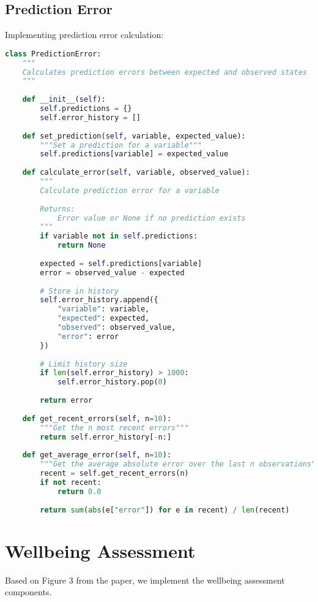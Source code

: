 \documentclass[11pt,a4paper]{article}
\begin{document}
\subsection{Prediction Error}
Implementing prediction error calculation:

\begin{lstlisting}[language=Python]
class PredictionError:
    """
    Calculates prediction errors between expected and observed states
    """
    
    def __init__(self):
        self.predictions = {}
        self.error_history = []
        
    def set_prediction(self, variable, expected_value):
        """Set a prediction for a variable"""
        self.predictions[variable] = expected_value
        
    def calculate_error(self, variable, observed_value):
        """
        Calculate prediction error for a variable
        
        Returns:
            Error value or None if no prediction exists
        """
        if variable not in self.predictions:
            return None
            
        expected = self.predictions[variable]
        error = observed_value - expected
        
        # Store in history
        self.error_history.append({
            "variable": variable,
            "expected": expected,
            "observed": observed_value,
            "error": error
        })
        
        # Limit history size
        if len(self.error_history) > 1000:
            self.error_history.pop(0)
            
        return error
        
    def get_recent_errors(self, n=10):
        """Get the n most recent errors"""
        return self.error_history[-n:]
        
    def get_average_error(self, n=10):
        """Get the average absolute error over the last n observations"""
        recent = self.get_recent_errors(n)
        if not recent:
            return 0.0
            
        return sum(abs(e["error"]) for e in recent) / len(recent)
\end{lstlisting}

\section{Wellbeing Assessment}
Based on Figure 3 from the paper, we implement the wellbeing assessment components.
\end{document}

